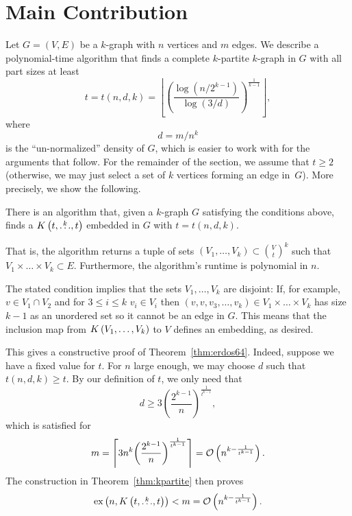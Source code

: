 
\section{Main Contribution}\label{sec:algorithm}
Let $G = (V, E)$ be a $k$-graph with $n$ vertices and $m$ edges.
We describe a polynomial-time algorithm that finds a complete $k$-partite $k$-graph in $G$
with all part sizes at least
\begin{equation}
     t = t (n, d, k) = \left\lfloor
        \left(  \frac{\log (n/2^{k-1})}{\log (3/d)} \right)
        ^{\frac{1}{k-1}} \right\rfloor \label{eq:t},
\end{equation}
where
\begin{equation} \label{eq:d}
    d = m/n^k
\end{equation}
is the ``un-normalized'' density of $G$,
which is easier to work with for the arguments that follow.
For the remainder of the section, we assume that
$t \geq 2$ (otherwise, we may just select a set of $k$ vertices forming an edge in~$G$).
More precisely, we show the following.
\begin{theorem}\label{thm:kpartite}
    There is an algorithm that, given a $k$-graph $G$ satisfying the conditions above,
    finds a $K\left(t, \overset{k}{\dots}, t\right)$ embedded in $G$ with $t = t(n, d, k)$.

    That is, the algorithm returns a tuple of sets ${(V_1, \dots, V_k) \subset \binom{V}{t}^k}$ such that
    $V_1 \times \dots \times V_k \subset E$.
    Furthermore, the algorithm's runtime is polynomial in $n$.
\end{theorem}

\begin{remark}
    The stated condition implies that the sets $V_1, \dots, V_k$ are disjoint:
    If, for example, $v \in V_1 \cap V_2$ and for $3 \leq i \leq k$ $v_i \in V_i$ then
    $(v, v, v_3, \dots, v_k) \in V_1 \times \dots \times V_k$ has size $k-1$ as an unordered set so it cannot
    be an edge in $G$.
    This means that the inclusion map from $K\left(V_1, \dots, V_k\right)$ to $V$ defines an embedding, as desired.
\end{remark}

This gives a constructive proof of Theorem~\ref{thm:erdos64}.
Indeed, suppose we have a fixed value for $t$.
For $n$ large enough, we may choose $d$ such that $t(n, d, k) \geq t$.
By our definition of $t$, we only need that
\[
    d \geq 3 {\left( \frac{2^{k-1}}{n}\right)}^{\frac{1}{t^{k-1}}},
\]
which is satisfied for
\[
    m =
    \left\lceil
    3 n^k {\left( \frac{2^{k-1}}{n}\right)}^{\frac{1}{t^{k-1}}}
    \right\rceil =
    \mathcal{O}\left(n^{k - \frac{1}{t^{k-1}}}\right).
\]
The construction in Theorem~\ref{thm:kpartite} then proves
\[
    \text{ex} \left( n, K\left(t, \overset{k}{\dots}, t\right) \right) < m = \mathcal{O}\left(n^{k - \frac{1}{t^{k-1}}}\right).
\]

